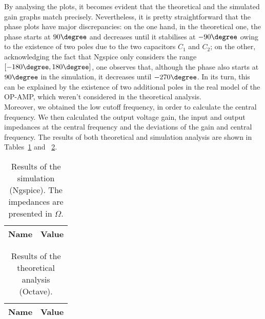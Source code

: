 By analysing the plots, it becomes evident that the theoretical and the simulated gain graphs match precisely. Nevertheless, it is pretty straightforward that the phase plots have major discrepancies: on the one hand, in the theoretical one, the phase starts at $90\degree$ and decreases until it stabilises at $-90\degree$ owing to the existence of two poles due to the two capacitors $C_1$ and $C_2$; on the other, acknowledging the fact that Ngspice only considers the range $[-180\degree , 180\degree ]$, one observes that, although the phase also starts at $90\degree$ in the simulation, it decreases until $-270\degree$. In its turn, this can be explained by the existence of two additional poles in the real model of the OP-AMP, which weren’t considered in the theoretical analysis.\\

Moreover, we obtained the low cutoff frequency, in order to calculate the central frequency. We then calculated the output voltage gain, the input and output impedances at the central frequency and the deviations of the gain and central frequency. The results of both theoretical and simulation analysis are shown in Tables~\ref{tab:resultsngspice} and ~\ref{tab:resultsoctave}.

\vspace{5mm}

\noindent
\begin{minipage}[c]{0.5\linewidth}

\begin{table}[H]
 \centering
 \begin{tabular}{|l|r|}
 \hline
 {\bf Name} & {\bf Value} \\ \hline
 
 
 \end{tabular}
 \caption{Results of the simulation (Ngspice). The impedances are presented in $\Omega$.}
 \label{tab:resultsngspice}
 \end{table}
 
\end{minipage}
\begin{minipage}[c]{0.5\linewidth}

\vspace{-5mm}
 
 \begin{table}[H]
 \centering
 \begin{tabular}{|l|r|}
 \hline
 {\bf Name} & {\bf Value} \\ \hline
 
 \end{tabular}
 \caption{Results of the theoretical analysis (Octave).}
 \label{tab:resultsoctave}
 \end{table}
 
\end{minipage}

